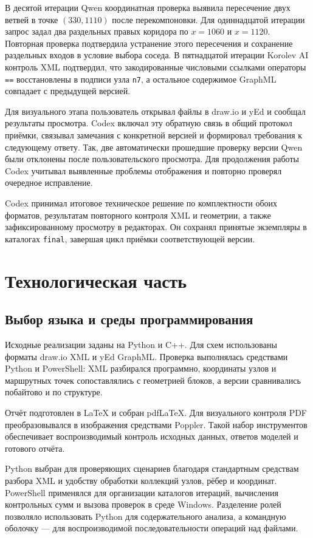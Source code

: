\documentclass[a4paper,12pt]{extreport}
\newcommand{\code}[1]{\texttt{#1}}
\begin{document}
В десятой итерации Qwen координатная проверка выявила пересечение двух ветвей в точке $(330, 1110)$ после перекомпоновки. Для одиннадцатой итерации запрос задал два раздельных правых коридора по $x=1060$ и $x=1120$. Повторная проверка подтвердила устранение этого пересечения и сохранение раздельных входов в условие выбора соседа. В пятнадцатой итерации Korolev AI контроль XML подтвердил, что закодированные числовыми ссылками операторы \code{==} восстановлены в подписи узла \code{n7}, а остальное содержимое GraphML совпадает с предыдущей версией.

Для визуального этапа пользователь открывал файлы в draw.io и yEd и сообщал результаты просмотра. Codex включал эту обратную связь в общий протокол приёмки, связывал замечания с конкретной версией и формировал требования к следующему ответу. Так, две автоматически прошедшие проверку версии Qwen были отклонены после пользовательского просмотра. Для продолжения работы Codex учитывал выявленные проблемы отображения и повторно проверял очередное исправление.

Codex принимал итоговое техническое решение по комплектности обоих форматов, результатам повторного контроля XML и геометрии, а также зафиксированному просмотру в редакторах. Он сохранял принятые экземпляры в каталогах \code{final}, завершая цикл приёмки соответствующей версии.

\chapter{Технологическая часть}

\section{Выбор языка и среды программирования}

Исходные реализации заданы на Python и C++. Для схем использованы форматы draw.io XML и yEd GraphML. Проверка выполнялась средствами Python и PowerShell: XML разбирался программно, координаты узлов и маршрутных точек сопоставлялись с геометрией блоков, а версии сравнивались побайтово и по структуре.

Отчёт подготовлен в LaTeX и собран pdfLaTeX. Для визуального контроля PDF преобразовывался в изображения средствами Poppler. Такой набор инструментов обеспечивает воспроизводимый контроль исходных данных, ответов моделей и готового отчёта.

Python выбран для проверяющих сценариев благодаря стандартным средствам разбора XML и удобству обработки коллекций узлов, рёбер и координат. PowerShell применялся для организации каталогов итераций, вычисления контрольных сумм и вызова проверок в среде Windows. Разделение ролей позволяло использовать Python для содержательного анализа, а командную оболочку --- для воспроизводимой последовательности операций над файлами.
\end{document}

